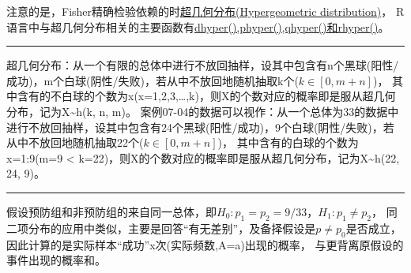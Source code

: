 \documentclass[
]{article}
\begin{document}
注意的是，Fisher精确检验依赖的时\href{https://zh.wikipedia.org/zh-hans/\%E8\%B6\%85\%E5\%87\%A0\%E4\%BD\%95\%E5\%88\%86\%E5\%B8\%83}{超几何分布(Hypergeometric distribution)}，
R语言中与超几何分布相关的主要函数有\href{https://stat.ethz.ch/R-manual/R-devel/library/stats/html/Hypergeometric.html}{dhyper(),phyper(),qhyper()和rhyper()}。

\begin{center}\rule{0.5\linewidth}{0.5pt}\end{center}

超几何分布：从一个有限的总体中进行不放回抽样，设其中包含有n个黑球(阳性/成功)，m个白球(阴性/失败)，若从中不放回地随机抽取k个(\(k\in[0,m+n]\))，
其中含有的不白球的个数为x(x=1,2,3,\ldots,k)，则X的个数对应的概率即是服从超几何分布，记为X\textasciitilde h(k, n, m)。
案例07-04的数据可以视作：从一个总体为33的数据中进行不放回抽样，设其中包含有24个黑球(阳性/成功)，9个白球(阴性/失败)，若从中不放回地随机抽取22个(\(k\in[0,m+n]\))，
其中含有的白球的个数为x=1:9(m=9 \textless{} k=22)，则X的个数对应的概率即是服从超几何分布，记为X\textasciitilde h(22, 24, 9)。

\begin{center}\rule{0.5\linewidth}{0.5pt}\end{center}

假设预防组和非预防组的来自同一总体，即\(H_0:p_1=p_2=9/33\)，\(H_1:p_1≠p_2\)，
同二项分布的应用中类似，主要是回答``有无差别''，及备择假设是\(p≠p_0\)是否成立，因此计算的是实际样本``成功''x次(实际频数,A=a)出现的概率，
与更背离原假设的事件出现的概率和。
\end{document}
